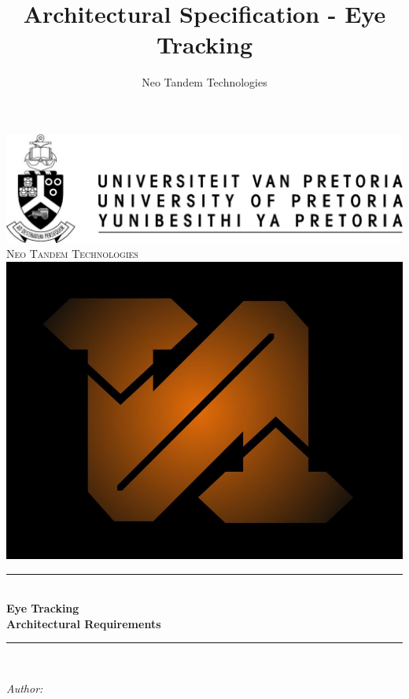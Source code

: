 \documentclass[a4paper,12pt]{report}
\author{Neo Tandem Technologies}
\title{ Architectural Specification - Eye Tracking}
\newcommand{\HRule}{\rule{\linewidth}{0.5mm}}
\begin{document}
\setlength{\parskip}{6pt}

\begin{titlepage}

\begin{center}
\includegraphics[scale=1]{../GeneralImages/up-logo.jpg}
\\[1cm]    
    

\textsc{\LARGE Neo Tandem Technologies}\\[1.5cm]
\includegraphics[scale=0.2]{../GeneralImages/NTT.jpg}\\[1.5cm]
\HRule \\[0.4cm]
{ \huge \bfseries Eye Tracking}\\[0.4cm]
{ \huge \bfseries Architectural Requirements}\\[0.4cm]
\HRule \\[0.4cm]
\begin{minipage}{0.4\textwidth}
\begin{flushleft} \large
\emph{Author:}\\

\end{flushleft}
\end{minipage}
\end{center}
\end{titlepage}
\end{document}
